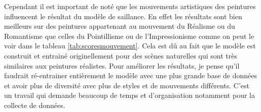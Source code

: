 \par
Cependant il est important de noté que les mouvements artistiques des peintures influencent le résultat du modèle de saillance. En effet les résultats sont bien meilleurs sur des peintures appartenant au mouvement du Réalisme ou du Romantisme que celles du Pointillisme ou de l'Impressionisme comme on peut le voir dans le tableau \ref{tab:scoresmouvement}. Cela est dû au fait que le modèle est construit et entrainé originellement pour des scènes naturelles qui sont très similaires aux peintures réalistes. Pour améliorer les résultats, je pense qu'il faudrait ré-entrainer entièrement le modèle avec une plus grande base de données et avoir plus de diversité avec plus de styles et de mouvements différents. C'est un travail qui demande beaucoup de temps et d'organisation notamment pour la collecte de données.